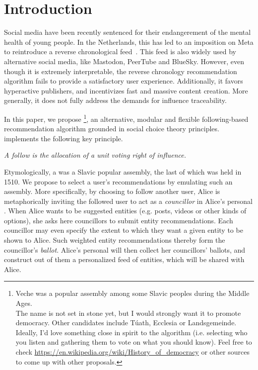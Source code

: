 \section{Introduction}
\label{sec:introduction}

Social media have been recently sentenced 
for their endangerement of the mental health of young people.
In the Netherlands, this has led to an imposition on Meta 
to reintroduce a reverse chronological feed~\cite{reuters-dutch-meta}.
This feed is also widely used by alternative social media,
like Mastodon, PeerTube and BlueSky.
However, even though it is extremely interpretable,
the reverse chronology recommendation algorithm fails 
to provide a satisfactory user experience.
Additionally, it favors hyperactive publishers,
and incentivizes fast and massive content creation.
More generally, it does not fully address the demands for influence traceability.

In this paper, we propose \Veche{}\footnote{
    Veche was a popular assembly among some Slavic peoples during the Middle Ages. \\
    The name is not set in stone yet, but I would strongly want it to promote democracy.
    Other candidates include T\'uath, Ecclesia or Landsgemeinde.
    Ideally, I'd love something close in spirit to the algorithm
    (i.e. selecting who you listen and gathering them to vote on what you should know).
    Feel free to check \url{https://en.wikipedia.org/wiki/History_of_democracy}
    or other sources to come up with other proposals.
},
an alternative, modular and flexible following-based recommendation algorithm
grounded in social choice theory principles.
\Veche{} implements the following key principle.

\begin{center}
    \emph{A follow is the allocation of a unit voting right of influence.}
\end{center}

Etymologically, a \Veche{} was a Slavic popular assembly,
the last of which was held in 1510.
We propose to select a user's recommendations by emulating such an assembly.
More specifically, by choosing to follow another user,
Alice is metaphorically inviting the followed user to act as a \emph{councillor}
in Alice's personal \Veche{}.
When Alice wants to be suggested entities (e.g. posts, videos or other kinds of options),
she asks here councillors to submit entity recommendations.
Each councillor may even specify the extent to which they want a given entity to be shown to Alice.
Such weighted entity recommendations thereby form the councillor's \emph{ballot}.
Alice's personal \Veche{} will then collect her councillors' ballots,
and construct out of them a personalized feed of entities,
which will be shared with Alice.

